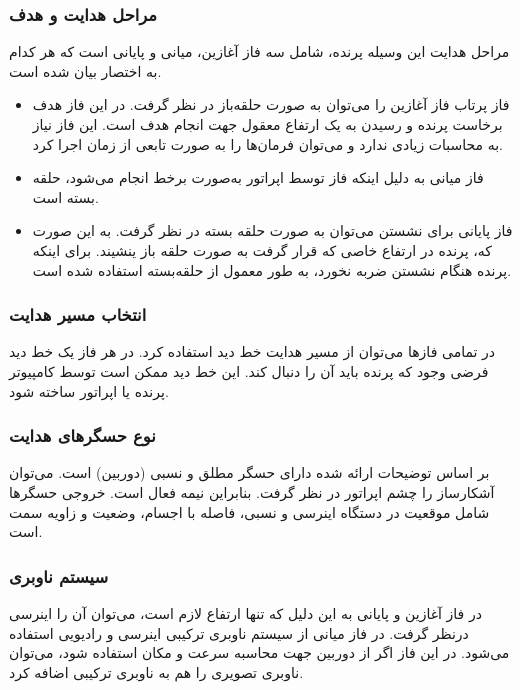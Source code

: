 \subsubsection{مراحل هدایت و هدف}
مراحل هدایت این وسیله پرنده، شامل سه فاز آغازین، میانی و پایانی است که هر کدام به اختصار بیان شده است.
\begin{itemize}
	\item فاز پرتاب
	فاز آغازین را می‌توان به صورت حلقه‌باز در نظر گرفت. در این فاز هدف برخاست
	پرنده و رسیدن به یک ارتفاع معقول جهت انجام هدف است. 
	این فاز نیاز به محاسبات زیادی ندارد و می‌توان فرمان‌ها را به صورت تابعی از زمان اجرا کرد.
	
	\item فاز میانی
	به دلیل اینکه فاز توسط اپراتور به‌صورت برخط انجام می‌شود، حلقه بسته است.
	
	\item فاز پایانی
	برای نشستن
	می‌توان به صورت حلقه بسته در نظر گرفت. به این صورت که، پرنده در ارتفاع خاصی که قرار گرفت به صورت حلقه باز ینشیند. برای اینکه پرنده هنگام نشستن ضربه نخورد، به طور معمول از حلقه‌‌بسته استفاده شده است.
\end{itemize}

\subsubsection{انتخاب مسیر هدایت}

در تمامی فازها می‌توان از مسیر هدایت خط دید استفاده کرد. در هر فاز یک خط دید فرضی وجود که پرنده باید آن را دنبال کند. این خط دید ممکن است توسط کامپیوتر پرنده یا اپراتور ساخته شود.
\subsubsection{نوع حسگرهای هدایت}
بر اساس توضیحات ارائه شده دارای حسگر مطلق و نسبی (دوربین) است. می‌توان آشکارساز را چشم اپراتور در نظر گرفت. بنابراین نیمه فعال است.
خروجی حسگرها شامل موقعیت در دستگاه اینرسی و نسبی، فاصله با اجسام،  وضعیت و زاویه سمت است.
\subsubsection{سیستم ناوبری}
در فاز آغازین و پایانی به این دلیل که تنها ارتفاع لازم است، می‌توان آن را اینرسی درنظر گرفت. در فاز میانی از سیستم ناوبری ترکیبی اینرسی و رادیویی استفاده می‌شود. در این فاز اگر از دوربین جهت محاسبه سرعت و مکان استفاده شود، می‌توان ناوبری تصویری را هم به ناوبری ترکیبی اضافه کرد.

